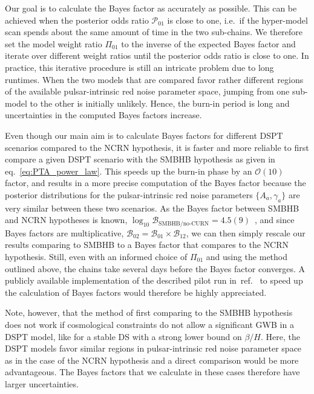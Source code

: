 	Our goal is to calculate the Bayes factor as accurately as possible. This can be achieved when the posterior odds ratio $\mathcal{P}_{01}$ is close to one, i.e.~if the hyper-model scan spends about the same amount of time in the two sub-chains. We therefore set the model weight ratio $\Pi_{01}$ to the inverse of the expected Bayes factor and iterate over different  weight ratios until the posterior odds ratio is close to one. In practice, this iterative procedure is still an intricate problem due to long runtimes. When the two models that are compared favor rather different regions of the available pulsar-intrinsic red noise parameter space, jumping from one sub-model to the other is initially unlikely. Hence, the burn-in period is long and uncertainties in the computed Bayes factors increase.
	
	Even though our main aim is to calculate Bayes factors for different \ac{DSPT} scenarios compared to the \ac{NCRN} hypothesis, it is faster and more reliable to first compare a given \ac{DSPT} scenario with the \ac{SMBHB} hypothesis as given in eq.~\eqref{eq:PTA_power_law}. This speeds up the burn-in phase by an $\mathcal{O}(10)$ factor, and results in a more precise computation  of the Bayes factor because the posterior distributions for the pulsar-intrinsic red noise parameters $\{A_a, \gamma_a\}$ are very similar between these two scenarios. As the Bayes factor between \ac{SMBHB} and \ac{NCRN} hypotheses is known, $\log_{10} \mathcal{B}_\text{SMBHB/no-CURN} = 4.5(9)$~\cite{NANOGrav:2020bcs}, and since Bayes factors are multiplicative, $\mathcal{B}_{02} = \mathcal{B}_{01} \times \mathcal{B}_{12}$, we can then simply rescale our results comparing to \ac{SMBHB} to a Bayes factor that compares to the \ac{NCRN} hypothesis. Still, even with an informed choice of $\Pi_{01}$ and using the method outlined above, the chains take several days before the Bayes factor converges. A publicly available implementation of the described pilot run in~ref.~\cite{Chamberlin:2014ria} to speed up the calculation of Bayes factors would therefore be highly appreciated.
	
	Note, however, that the method of first comparing to the \ac{SMBHB} hypothesis does not work if cosmological constraints do not allow a significant \ac{GWB} in a \ac{DSPT} model, like for a stable \ac{DS} with a strong lower bound on $\beta / H$. Here, the \ac{DSPT} models favor similar regions in pulsar-intrinsic red noise parameter space  as in the case of the \ac{NCRN} hypothesis and a direct comparison would be more advantageous. The Bayes factors that we calculate in these cases therefore have larger uncertainties.
	
